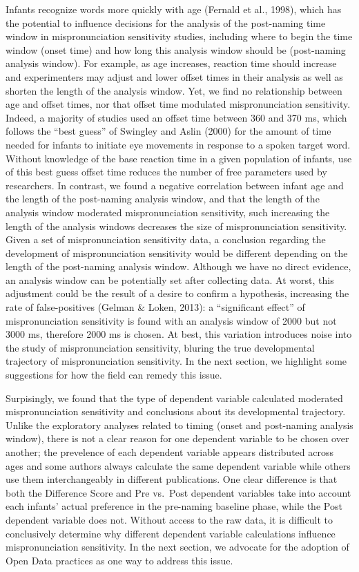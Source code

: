 \documentclass[man]{apa6}
\begin{document}
Infants recognize words more quickly with age (Fernald et al., 1998), which has the potential to influence decisions for the analysis of the post-naming time window in mispronunciation sensitivity studies, including where to begin the time window (onset time) and how long this analysis window should be (post-naming analysis window). For example, as age increases, reaction time should increase and experimenters may adjust and lower offset times in their analysis as well as shorten the length of the analysis window. Yet, we find no relationship between age and offset times, nor that offset time modulated mispronunciation sensitivity. Indeed, a majority of studies used an offset time between 360 and 370 ms, which follows the \enquote{best guess} of Swingley and Aslin (2000) for the amount of time needed for infants to initiate eye movements in response to a spoken target word. Without knowledge of the base reaction time in a given population of infants, use of this best guess offset time reduces the number of free parameters used by researchers. In contrast, we found a negative correlation between infant age and the length of the post-naming analysis window, and that the length of the analysis window moderated mispronunciation sensitivity, such increasing the length of the analysis windows decreases the size of mispronunciation sensitivity. Given a set of mispronunciation sensitivity data, a conclusion regarding the development of mispronunciation sensitivity would be different depending on the length of the post-naming analysis window. Although we have no direct evidence, an analysis window can be potentially set after collecting data. At worst, this adjustment could be the result of a desire to confirm a hypothesis, increasing the rate of false-positives (Gelman \& Loken, 2013): a \enquote{significant effect} of mispronunciation sensitivity is found with an analysis window of 2000 but not 3000 ms, therefore 2000 ms is chosen. At best, this variation introduces noise into the study of mispronunciation sensitivity, bluring the true developmental trajectory of mispronunciation sensitivity. In the next section, we highlight some suggestions for how the field can remedy this issue.

Surpisingly, we found that the type of dependent variable calculated moderated mispronunciation sensitivity and conclusions about its developmental trajectory. Unlike the exploratory analyses related to timing (onset and post-naming analysis window), there is not a clear reason for one dependent variable to be chosen over another; the prevelence of each dependent variable appears distributed across ages and some authors always calculate the same dependent variable while others use them interchangeably in different publications. One clear difference is that both the Difference Score and Pre vs.~Post dependent variables take into account each infants' actual preference in the pre-naming baseline phase, while the Post dependent variable does not. Without access to the raw data, it is difficult to conclusively determine why different dependent variable calculations influence mispronunciation sensitivity. In the next section, we advocate for the adoption of Open Data practices as one way to address this issue.
\end{document}
